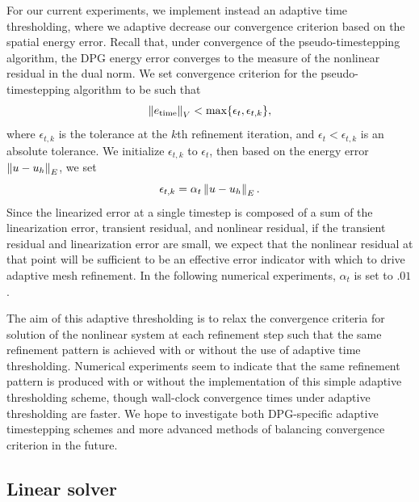 For our current experiments, we implement instead an adaptive time thresholding, where we adaptive decrease our convergence criterion based on the spatial energy error.  Recall that, under convergence of the pseudo-timestepping algorithm, the DPG energy error converges to the measure of the nonlinear residual in the dual norm.  We set convergence criterion for the pseudo-timestepping algorithm to be such that 
\[
\nor{e_{\rm time}}_V < \max \{\epsilon_t,\epsilon_{t,k}\},
\]
where $\epsilon_{t,k}$ is the tolerance at the $k$th refinement iteration, and $\epsilon_t < \epsilon_{t,k}$ is an absolute tolerance.  We initialize $\epsilon_{t,k}$ to $\epsilon_{t}$, then based on the energy error $\nor{u-u_h}_E$, we set 
\[
\epsilon_{t,k} = \alpha_t \nor{u-u_h}_E.
\]
Since the linearized error at a single timestep is composed of a sum of the linearization error, transient residual, and nonlinear residual, if the transient residual and linearization error are small, we expect that the nonlinear residual at that point will be sufficient to be an effective error indicator with which to drive adaptive mesh refinement.  In the following numerical experiments, $\alpha_t$ is set to $.01$.  

The aim of this adaptive thresholding is to relax the convergence criteria for solution of the nonlinear system at each refinement step such that the same refinement pattern is achieved with or without the use of adaptive time thresholding.  Numerical experiments seem to indicate that the same refinement pattern is produced with or without the implementation of this simple adaptive thresholding scheme, though wall-clock convergence times under adaptive thresholding are faster.  We hope to investigate both DPG-specific adaptive timestepping schemes and more advanced methods of balancing convergence criterion in the future.  

\subsection{Linear solver}

